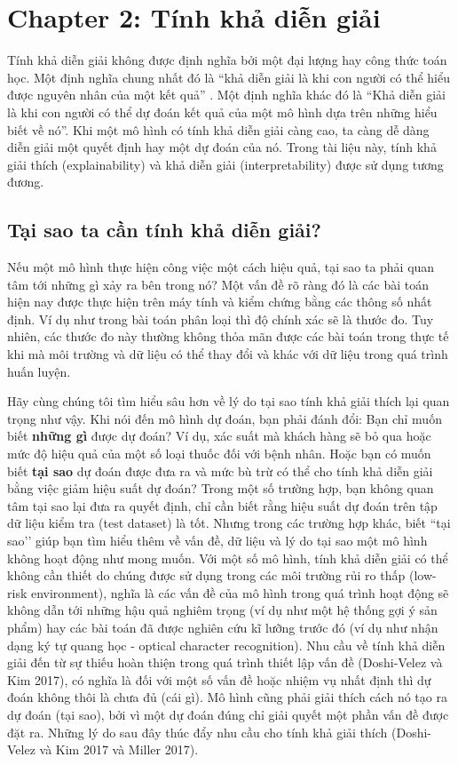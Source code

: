 \chapter*{Chapter 2: Tính khả diễn giải}
Tính khả diễn giải không được định nghĩa bởi một đại lượng hay công thức toán học. Một định nghĩa chung nhất đó là ``khả diễn giải là khi con người có thể hiểu được nguyên nhân của một kết quả'' . Một định nghĩa khác đó là ``Khả diễn giải là khi con người có thể dự đoán kết quả của một mô hình dựa trên những hiểu biết về nó''. Khi một mô hình có tính khả diễn giải càng cao, ta càng dễ dàng diễn giải một quyết định hay một dự đoán của nó. Trong tài liệu này, tính khả giải thích (explainability) và khả diễn giải (interpretability) được sử dụng tương đương.

\clearpage

\section{Tại sao ta cần tính khả diễn giải?}
Nếu một mô hình thực hiện công việc một cách hiệu quả, tại sao ta phải quan tâm tới những gì xảy ra bên trong nó? Một vấn đề rõ ràng đó là các bài toán hiện nay được thực hiện trên máy tính và kiểm chứng bằng các thông số nhất định. Ví dụ như trong bài toán phân loại thì độ chính xác sẽ là thước đo. Tuy nhiên, các thước đo này thường không thỏa mãn được các bài toán trong thực tế khi mà môi trường và dữ liệu có thể thay đổi và khác với dữ liệu trong quá trình huấn luyện.

Hãy cùng chúng tôi tìm hiểu sâu hơn về lý do tại sao tính khả giải thích lại quan trọng như vậy. Khi nói đến mô hình dự đoán, bạn phải đánh đổi: Bạn chỉ muốn biết \textbf{những gì} được dự đoán? Ví dụ, xác suất mà khách hàng sẽ bỏ qua hoặc mức độ hiệu quả của một số loại thuốc đối với bệnh nhân. Hoặc bạn có muốn biết \textbf{tại sao} dự đoán được đưa ra và mức bù trừ có thể cho tính khả diễn giải bằng việc giảm hiệu suất dự đoán? Trong một số trường hợp, bạn không quan tâm tại sao lại đưa ra quyết định, chỉ cần biết rằng hiệu suất dự đoán trên tập dữ liệu kiểm tra (test dataset) là tốt. Nhưng trong các trường hợp khác, biết ``tại sao’’ giúp bạn tìm hiểu thêm về vấn đề, dữ liệu và lý do tại sao một mô hình không hoạt động như mong muốn. Với một số mô hình, tính khả diễn giải có thể không cần thiết do chúng được sử dụng trong các môi trường rủi ro thấp (low-risk environment), nghĩa là các vấn đề của mô hình trong quá trình hoạt động sẽ không dẫn tới những hậu quả nghiêm trọng (ví dụ như một hệ thống gợi ý sản phẩm) hay các bài toán đã được nghiên cứu kĩ lưỡng trước đó (ví dụ như nhận dạng ký tự quang học - optical character recognition). Nhu cầu về tính khả diễn giải đến từ sự thiếu hoàn thiện trong quá trình thiết lập vấn đề (Doshi-Velez và Kim 2017), có nghĩa là đối với một số vấn đề hoặc nhiệm vụ nhất định thì dự đoán không thôi là chưa đủ (cái gì). Mô hình cũng phải giải thích cách nó tạo ra dự đoán (tại sao), bởi vì một dự đoán đúng chỉ giải quyết một phần vấn đề được đặt ra. Những lý do sau đây thúc đẩy nhu cầu cho tính khả giải thích (Doshi-Velez và Kim 2017 và Miller 2017).

